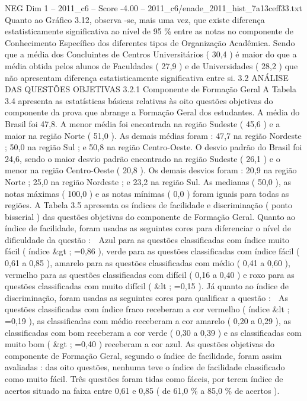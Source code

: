 \begin{textsample}{NEG Dim 1 – 2011\_c6 – Score -4.00 – 2011\_c6/enade\_2011\_hist\_7a13ceff33.txt}
Quanto ao Gráfico 3.12, observa -se, mais uma vez, que existe diferença estatisticamente significativa ao nível de 95 \% entre as notas no componente de Conhecimento Específico dos diferentes tipos de Organização Acadêmica.
Sendo que a média dos Concluintes de Centros Universitários ( 30,4 ) é maior do que a média obtida pelos alunos de Faculdades ( 27,9 ) e de Universidades ( 28,2 ) que não apresentam diferença estatisticamente significativa entre si. 3.2 ANÁLISE DAS QUESTÕES OBJETIVAS 3.2.1 Componente de Formação Geral A Tabela 3.4 apresenta as estatísticas básicas relativas às oito questões objetivas do componente da prova que abrange a Formação Geral dos estudantes.
A média do Brasil foi 47,8.
A menor média foi encontrada na região Sudeste ( 45,6 ) e a maior na região Norte ( 51,0 ).
As demais médias foram : 47,7 na região Nordeste ; 50,0 na região Sul ; e 50,8 na região Centro-Oeste.
O desvio padrão do Brasil foi 24,6, sendo o maior desvio padrão encontrado na região Sudeste ( 26,1 ) e o menor na região Centro-Oeste ( 20,8 ).
Os demais desvios foram : 20,9 na região Norte ; 25,0 na região Nordeste ; e 23,2 na região Sul.
As medianas ( 50,0 ), as notas máximas ( 100,0 ) e as notas mínimas ( 0,0 ) foram iguais para todas as regiões.
A Tabela 3.5 apresenta os índices de facilidade e discriminação ( ponto bisserial ) das questões objetivas do componente de Formação Geral.
Quanto ao índice de facilidade, foram usadas as seguintes cores para diferenciar o nível de dificuldade da questão :  Azul para as questões classificadas com índice muito fácil ( índice \&gt ; =0,86 ), verde para as questões classificadas com índice fácil ( 0,61 a 0,85 ), amarelo para as questões classificadas com médio ( 0,41 a 0,60 ), vermelho para as questões classificadas com difícil ( 0,16 a 0,40 ) e roxo para as questões classificadas com muito difícil ( \&lt ; =0,15 ).
Já quanto ao índice de discriminação, foram usadas as seguintes cores para qualificar a questão :  As questões classificadas com índice fraco receberam a cor vermelho ( índice \&lt ; =0,19 ), as classificadas com médio receberam a cor amarelo ( 0,20 a 0,29 ), as classificadas com bom receberam a cor verde ( 0,30 a 0,39 ) e as classificadas com muito bom ( \&gt ; =0,40 ) receberam a cor azul.
As questões objetivas do componente de Formação Geral, segundo o índice de facilidade, foram assim avaliadas : das oito questões, nenhuma teve o índice de facilidade classificado como muito fácil.
Três questões foram tidas como fáceis, por terem índice de acertos situado na faixa entre 0,61 e 0,85 ( de 61,0 \% a 85,0 \% de acertos ).

\end{textsample}
